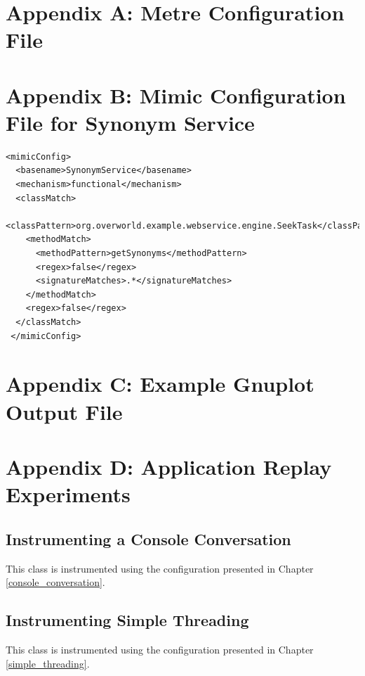 \documentclass[]{final_report}
\begin{document}
\newpage



\chapter*{Appendix A: Metre Configuration File}


\chapter*{Appendix B: Mimic Configuration File for Synonym Service}
\begin{lstlisting}
<mimicConfig>
  <basename>SynonymService</basename>
  <mechanism>functional</mechanism>
  <classMatch>
    <classPattern>org.overworld.example.webservice.engine.SeekTask</classPattern>
    <methodMatch>
      <methodPattern>getSynonyms</methodPattern>
      <regex>false</regex>
      <signatureMatches>.*</signatureMatches>
    </methodMatch>
    <regex>false</regex>
  </classMatch>
 </mimicConfig>
\end{lstlisting}

\chapter*{Appendix C: Example Gnuplot Output File}


\chapter*{Appendix D: Application Replay Experiments}
\section*{Instrumenting a Console Conversation}

This class is instrumented using the configuration presented in Chapter \ref{console_conversation}.
\newpage

\section*{Instrumenting Simple Threading}

This class is instrumented using the configuration presented in Chapter \ref{simple_threading}.
\newpage
\end{document}
